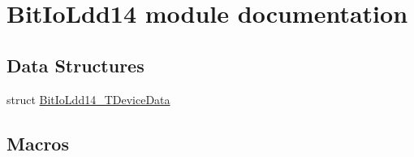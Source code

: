 \hypertarget{group___bit_io_ldd14__module}{}\section{Bit\+Io\+Ldd14 module documentation}
\label{group___bit_io_ldd14__module}
\subsection*{Data Structures}
\begin{DoxyCompactItemize}
\item 
struct \hyperlink{struct_bit_io_ldd14___t_device_data}{Bit\+Io\+Ldd14\+\_\+\+T\+Device\+Data}
\end{DoxyCompactItemize}
\subsection*{Macros}
